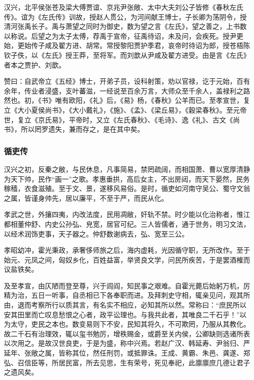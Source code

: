 \documentclass[]{article}
\begin{document}
汉兴，北平侯张苍及梁大傅贾谊、京兆尹张敞、太中大夫刘公子皆修《春秋左氏传》。谊为《左氏传》训故，授赵人贯公，为河间献王博士，子长卿为荡阴令，授清河张禹长子。禹与萧望之同时为御史，数为望之言《左氏》，望之善之，上书数以称说。后望之为太子太傅，荐禹于宣帝，征禹待诏，未及问，会疾死。授尹更始，更始传子咸及翟方进、胡常。常授黎阳贾护季君，哀帝时待诏为郎，授苍梧陈钦子佚，以《左氏》授王莽，至将军。而刘歆从尹咸及翟方进受。由是言《左氏》者本之贾护、刘歆。

赞曰：自武帝立《五经》博士，开弟子员，设科射策，劝以官禄，讫于元始，百有余年，传业者浸盛，支叶蕃滋，一经说至百余万言，大师众至千余人，盖禄利之路然也。初，《书》唯有欧阳，《礼》后，《易》杨，《春秋》公羊而已。至孝宣世，复立《大小夏侯尚书》，《大小戴礼》，《施》、《孟》、《梁丘易》，《穀梁春秋》。至元帝世，复立《京氏易》，平帝时，又立《左氏春秋》、《毛诗》、逸《礼》、古文《尚书》，所以罔罗遗失，兼而存之，是在其中矣。

\hypertarget{header-n5983}{%
\subsubsection{循吏传}\label{header-n5983}}

汉兴之初，反秦之敝，与民休息，凡事简易，禁罔疏阔，而相国萧、曹以宽厚清静为天下帅，民作``画一''之歌。孝惠垂拱，高后女主，不出房闼，而天下晏然，民务稼穑，衣食滋殖。至于文、景，遂移风易俗。是时，循吏如河南守吴公、蜀守文翁之属，皆谨身帅先，居以廉平，不至于严，而民从化。

孝武之世，外攘四夷，内改法度，民用凋敝，奸轨不禁。时少能以化治称者，惟江都相董仲舒、内史公孙弘、皃宽，居官可纪。三人皆儒者，通于世务，明习文法，以经术润饰吏事，天子器之。仲舒数谢病去，弘、宽至三公。

孝昭幼冲，霍光秉政，承奢侈师旅之后，海内虚耗，光因循守职，无所改作。至于始元、元凤之间，匈奴乡化，百姓益富，举贤良文学，问民所疾苦，于是罢酒榷而议盐铁矣。

及至孝宣，由仄陋而登至尊，兴于闾阎，知民事之艰难。自霍光薨后始躬万机，厉精为治，五日一听事，自丞相已下各奉职而进。及拜刺史守相，辄亲见问，观其所由，退而考察所行以质其言，有名实不相应，必知其所以然。常称曰：``庶民所以安其田里而亡叹息愁恨之心者，政平讼理也。与我共此者，其唯良二千石乎！''以为太守，吏民之本也。数变易则下不安，民知其将久，不可欺罔，乃服从其教化。故二千石有治理效，辄以玺书勉厉，增秩赐金，或爵至关内侯，公卿缺则选诸所表以次用之。是故汉世良吏，于是为盛，称中兴焉。若赵广汉、韩延寿、尹翁归、严延年、张敞之属，皆称其位，然任刑罚，或抵罪诛。王成、黄霸、朱邑、龚遂、郑弘、召信臣等，所居民富，所去见思，生有荣号，死见奉祀，此廪廪庶几德让君子之遗风矣。
\end{document}
